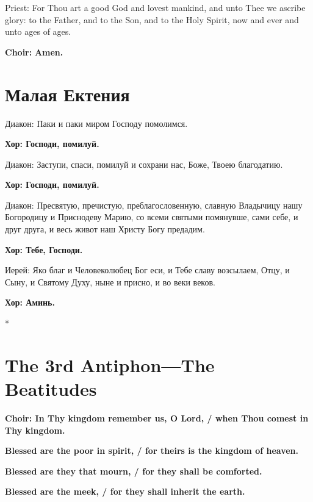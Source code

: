 \documentclass[12pt,a4paper,titlepage]{report}
\begin{document}
\begin{paracol}[1]{2}
  Priest: For Thou art a good God and lovest mankind, and unto Thee we ascribe glory: to the Father, and to the Son, and to the Holy Spirit, now and ever and unto ages of ages.

  \textbf{Choir:} \textbf{Amen.}

  \switchcolumn[1]

  \section*{Малая Ектения}

  Диакон: Паки и паки миром Господу помолимся.

  \textbf{Хор: Господи, помилуй.}

  Диакон: Заступи, спаси, помилуй и сохрани нас, Боже, Твоею благодатию.

  \textbf{Хор: Господи, помилуй.}

  Диакон: Пресвятую, пречистую, преблагословенную, славную Владычицу нашу Богородицу и Приснодеву Марию, со всеми святыми помянувше, сами себе, и друг друга, и весь живот наш Христу Богу предадим.

  \textbf{Хор: Тебе, Господи.}

  Иерей:  Яко благ и Человеколюбец Бог еси, и Тебе славу возсылаем, Отцу, и Сыну, и Святому Духу, ныне и присно, и во веки веков.

  \textbf{Хор: Аминь.}

  \switchcolumn[0]*

  \section*{The 3rd Antiphon---The Beatitudes}

  \textbf{Choir: In Thy kingdom remember us, O Lord, / when Thou comest in Thy kingdom.}

  \textbf{Blessed are the poor in spirit, / for theirs is the kingdom of heaven.}

  \textbf{Blessed are they that mourn, / for they shall be comforted.}

  \textbf{Blessed are the meek, / for they shall inherit the earth.}


\end{paracol}
\end{document}
